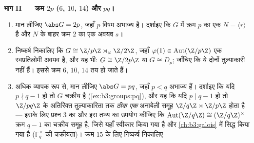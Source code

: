 \begin{problem}
\medskip
\noindent\textbf{भाग II --- क्रम $2p$ ($6$, $10$, $14$)
और $pq$।}
\begin{enumerate}[resume]
  \item मान लीजिए $\abs G = 2p$, जहाँ $p$ विषम अभाज्य है। दर्शाइए कि
        $G$ में क्रम $p$ का एक  $N = \langle r \rangle$ है
        और $N$ के बाहर क्रम $2$ का एक अवयव $s$।
  \item निष्कर्ष निकालिए कि $G \cong \Z/p\Z \rtimes_\varphi \Z/2\Z$, जहाँ $\varphi(1) \in \operatorname{Aut}(\Z/p\Z)$ एक स्वप्रतिलोमी
        अवयव है, और यह भी: $G \cong \Z/2p\Z$ या $G \cong
        D_p$; जाँचिए कि ये दोनों
        तुल्याकारी नहीं हैं। इससे क्रम $6$, $10$, $14$ तय
        हो जाते हैं।
  \item अधिक व्यापक रूप से, मान लीजिए $\abs G = pq$, जहाँ $p < q$ अभाज्य
        हैं। दर्शाइए कि यदि $p \nmid q-1$ हो तो $G$ चक्रीय है
        (\cref{ex:b3:groups:pq}), और यह कि यदि $p \mid q - 1$ हो तो $\Z/pq\Z$ के अतिरिक्त
        तुल्याकारिता तक \emph{ठीक एक} अनाबेली समूह $\Z/q\Z \rtimes \Z/p\Z$ होता है
        --- इसके लिए प्रश्न 3 का और इस तथ्य का उपयोग कीजिए कि
        $\operatorname{Aut}(\Z/q\Z) \cong
        (\Z/q\Z)^\times$ क्रम $q - 1$ का चक्रीय समूह है, जिसे यहाँ स्वीकार
        किया गया है और \cref{ch:b3:galois} में सिद्ध किया गया है ($\mathbb F_q^\times$ की
        चक्रीयता)। क्रम $15$ के लिए निष्कर्ष निकालिए।
\end{enumerate}


\end{problem}
